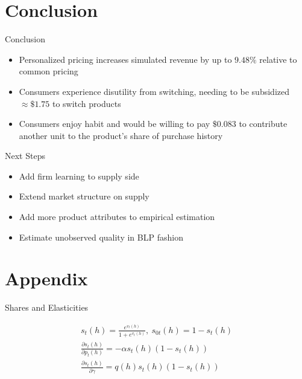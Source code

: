 \documentclass[aspectratio=169,professionalfonts]{beamer}
\begin{document}
\section{Conclusion}
\begin{frame}{Conclusion}
  \begin{itemize}
    \item Personalized pricing increases simulated revenue by up to $9.48\%$ relative to common pricing
    \item Consumers experience disutility from switching, needing to be subsidized $\approx\$1.75$ to switch products 
    \item Consumers enjoy habit and would be willing to pay $\$0.083$ to contribute another unit to the product's share of purchase history
  \end{itemize}
\end{frame}
\begin{frame}{Next Steps}
  \begin{itemize}
    \item Add firm learning to supply side
    \item Extend market structure on supply
    \item Add more product attributes to empirical estimation
    \item Estimate unobserved quality in BLP fashion
  \end{itemize}
\end{frame}

 

\section{Appendix}
  \begin{frame}{Shares and Elasticities}
  \begin{tcolorbox}
    [
    boxsep=0pt,
    left=2pt, right=2pt,
    top=1pt, bottom=1pt,
    before skip=2pt, after skip=2pt
    ]
    \setlength{\abovedisplayskip}{2pt}
    \setlength{\belowdisplayskip}{2pt}
    \begin{gather*}
      s_t(h) = \frac{e^{v_t(h)}}{1+e^{v_t(h)}}, \ s_{0t}(h) = 1-s_t(h) \\
      \frac{\partial s_t(h)}{\partial p_t(h)} = -\alpha s_t(h)(1-s_t(h)) \\
      \frac{\partial s_t(h)}{\partial\gamma} = q(h)s_t(h)(1-s_t(h))
    \end{gather*}
  \end{tcolorbox}
  \end{frame}
\end{document}
